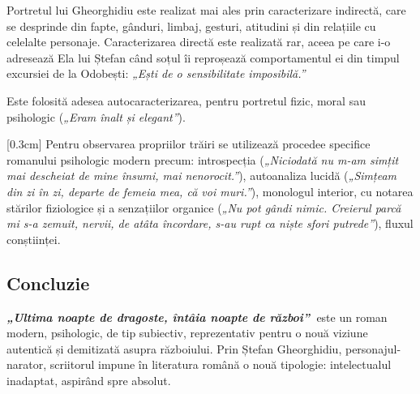 \documentclass[
12pt,                        %
a4paper                      %
]{article}
\newcommand{\operatitle}{\textbf{\textit{„Ultima noapte de dragoste, întâia noapte de război”\ }}} %
\begin{document}
Portretul lui Gheorghidiu este realizat mai ales prin caracterizare indirectă, care se desprinde din fapte, gânduri, limbaj, gesturi, atitudini și din relațiile cu celelalte personaje. Caracterizarea directă este realizată rar, aceea pe care i-o adresează Ela lui Ștefan când soțul îi reproșează comportamentul ei din timpul excursiei de la Odobești: \textit{„Ești de o sensibilitate imposibilă.”}

Este folosită adesea autocaracterizarea, pentru portretul fizic, moral sau psihologic (\textit{„Eram înalt și elegant”}).

[0.3cm]
Pentru observarea propriilor trăiri se utilizează procedee specifice romanului psihologic modern precum: introspecția (\textit{„Niciodată nu m-am simțit mai descheiat de mine însumi, mai nenorocit.”}), autoanaliza lucidă (\textit{„Simțeam din zi în zi, departe de  femeia mea, că voi muri.”}), monologul interior, cu notarea stărilor fiziologice și a senzațiilor organice (\textit{„Nu pot gândi nimic. Creierul parcă mi s-a zemuit, nervii, de atâta încordare, s-au rupt ca niște sfori putrede”}), fluxul conștiinței.

\subsection{Concluzie}

\operatitle este un roman modern, psihologic, de tip subiectiv, reprezentativ pentru o nouă viziune autentică și demitizată asupra războiului. Prin Ștefan Gheorghidiu, personajul-narator, scriitorul impune în literatura română o nouă tipologie: intelectualul inadaptat, aspirând spre absolut.
\end{document}
